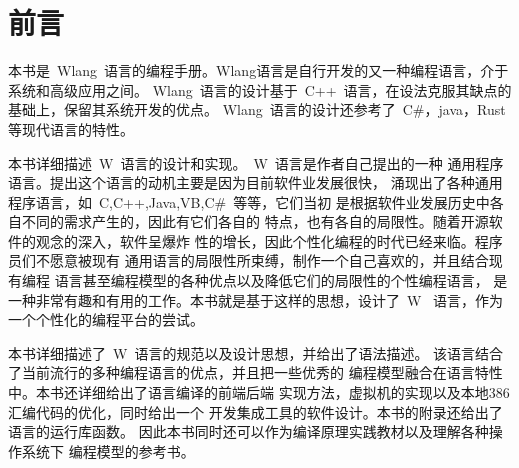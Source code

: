 ﻿%
%


\chapter{前言}

本书是~Wlang~语言的编程手册。Wlang语言是自行开发的又一种编程语言，介于系统和高级应用之间。
Wlang~语言的设计基于~C++~语言，在设法克服其缺点的基础上，保留其系统开发的优点。
Wlang~语言的设计还参考了~C\#，java，Rust等现代语言的特性。

本书详细描述~W~语言的设计和实现。~W~语言是作者自己提出的一种
通用程序语言。提出这个语言的动机主要是因为目前软件业发展很快，
涌现出了各种通用程序语言，如~C,C++,Java,VB,C\#~等等，它们当初
是根据软件业发展历史中各自不同的需求产生的，因此有它们各自的
特点，也有各自的局限性。随着开源软件的观念的深入，软件呈爆炸
性的增长，因此个性化编程的时代已经来临。程序员们不愿意被现有
通用语言的局限性所束缚，制作一个自己喜欢的，并且结合现有编程
语言甚至编程模型的各种优点以及降低它们的局限性的个性编程语言，
是一种非常有趣和有用的工作。本书就是基于这样的思想，设计了~W~
语言，作为一个个性化的编程平台的尝试。

本书详细描述了~W~语言的规范以及设计思想，并给出了语法描述。
该语言结合了当前流行的多种编程语言的优点，并且把一些优秀的
编程模型融合在语言特性中。本书还详细给出了语言编译的前端后端
实现方法，虚拟机的实现以及本地386汇编代码的优化，同时给出一个
开发集成工具的软件设计。本书的附录还给出了语言的运行库函数。
因此本书同时还可以作为编译原理实践教材以及理解各种操作系统下
编程模型的参考书。
